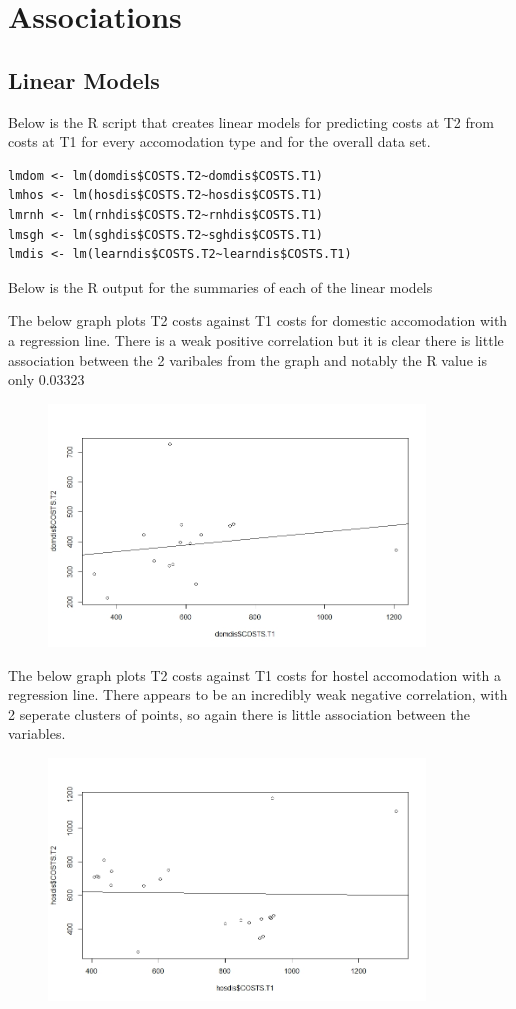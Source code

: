 \documentclass[]{article}
\begin{document}
\section{Associations}
\subsection{Linear Models}
Below is the R script that creates linear models for predicting costs at T2 from costs at T1 for every accomodation type and for the overall data set.
\begin{lstlisting}
lmdom <- lm(domdis$COSTS.T2~domdis$COSTS.T1)
lmhos <- lm(hosdis$COSTS.T2~hosdis$COSTS.T1)
lmrnh <- lm(rnhdis$COSTS.T2~rnhdis$COSTS.T1)
lmsgh <- lm(sghdis$COSTS.T2~sghdis$COSTS.T1)
lmdis <- lm(learndis$COSTS.T2~learndis$COSTS.T1)
\end{lstlisting}
Below is the R output for the summaries of each of the linear models

The below graph plots T2 costs against T1 costs for domestic accomodation with a regression line. There is a weak positive correlation but it is clear there is little association between the 2 varibales from the graph and notably the R value is only 0.03323
\begin{figure}[H]
\centering
\includegraphics[width=10cm]{RStudio/jpeg/Reg_DOM.jpeg}
\end{figure}
The below graph plots T2 costs against T1 costs for hostel accomodation with a regression line. There appears to be an incredibly weak negative correlation, with 2 seperate clusters of points, so again there is little association between the variables.
\begin{figure}[H]
\centering
\includegraphics[width=10cm]{RStudio/jpeg/Reg_HOS.jpeg}
\end{figure}
\end{document}
